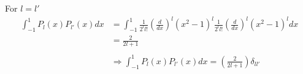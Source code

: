 \documentclass{article}
\begin{document}
For \(l = l'\)
\begin{align*}
	\int_{-1}^{1} P_l(x) P_{l'}(x) dx &= \int_{-1}^{1} \frac{1}{2^l l!} \left(\frac{d}{dx}\right)^l (x^2 - 1)^l \frac{1}{2^{l} l!} \left(\frac{d}{dx}\right)^{l} (x^2 - 1)^{l} dx \\
	&= \frac{2}{2l+1}\\ \\
	&\Rightarrow \int_{-1}^{1} P_l(x) P_{l'}(x) dx = \left(\frac{2}{2l+1}\right) \delta_{ll'}
\end{align*}
\end{document}
